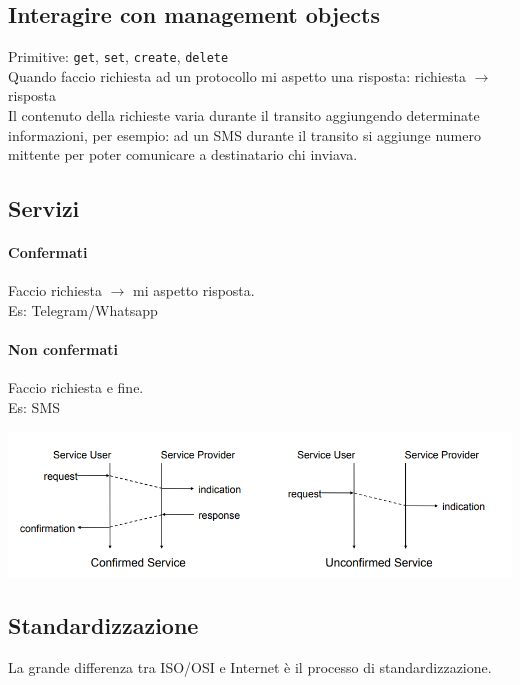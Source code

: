 \documentclass[10pt]{book}
\begin{document}
\subsection{Interagire con management objects}
Primitive: \texttt{get}, \texttt{set}, \texttt{create}, \texttt{delete}\\
Quando faccio richiesta ad un protocollo mi aspetto una risposta: richiesta $\rightarrow$ risposta\\
Il contenuto della richieste varia durante il transito aggiungendo determinate informazioni, per esempio: ad un SMS durante il transito si aggiunge numero mittente per poter comunicare a destinatario chi inviava.
\subsection{Servizi}
\paragraph{Confermati} Faccio richiesta $\rightarrow$ mi aspetto risposta.\\Es: Telegram/Whatsapp
\paragraph{Non confermati} Faccio richiesta e fine.\\Es: SMS
\begin{center}
	\includegraphics[scale=0.7]{timediag.png}
\end{center}
\pagebreak
\subsection{Standardizzazione}
La grande differenza tra ISO/OSI e Internet è il processo di standardizzazione.
\end{document}

